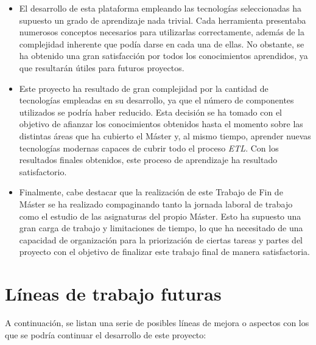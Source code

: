 \begin{itemize}
    \item El desarrollo de esta plataforma empleando las tecnologías seleccionadas ha supuesto un grado de aprendizaje nada trivial. Cada herramienta presentaba numerosos conceptos necesarios para utilizarlas correctamente, además de la complejidad inherente que podía darse en cada una de ellas. No obstante, se ha obtenido una gran satisfacción por todos los conocimientos aprendidos, ya que resultarán útiles para futuros proyectos.

    \item Este proyecto ha resultado de gran complejidad por la cantidad de tecnologías empleadas en su desarrollo, ya que el número de componentes utilizados se podría haber reducido. Esta decisión se ha tomado con el objetivo de afianzar los conocimientos obtenidos hasta el momento sobre las distintas áreas que ha cubierto el Máster y, al mismo tiempo, aprender nuevas tecnologías modernas capaces de cubrir todo el proceso \textit{ETL}. Con los resultados finales obtenidos, este proceso de aprendizaje ha resultado satisfactorio.

    \item Finalmente, cabe destacar que la realización de este Trabajo de Fin de Máster se ha realizado compaginando tanto la jornada laboral de trabajo como el estudio de las asignaturas del propio Máster. Esto ha supuesto una gran carga de trabajo y limitaciones de tiempo, lo que ha necesitado de una capacidad de organización para la priorización de ciertas tareas y partes del proyecto con el objetivo de finalizar este trabajo final de manera satisfactoria.

\end{itemize}

\section{Líneas de trabajo futuras} \label{section:future_works}

A continuación, se listan una serie de posibles líneas de mejora o aspectos con los que se podría continuar el desarrollo de este proyecto:

